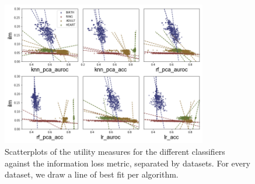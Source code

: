 \begin{figure}[!ht]
    \centering
    \includegraphics[width=0.8\textwidth]{project/fig/scatter_sep_trends/ilm_scatter.png}
    \caption{Scatterplots of the utility measures for the different classifiers against the information loss metric, separated by datasets. For every dataset, we draw a line of best fit per algorithm.}
\end{figure}